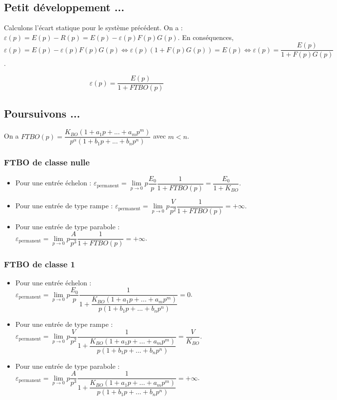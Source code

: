 \documentclass[10pt,fleqn]{article} %
\begin{document}
\subsection*{Petit développement ...}

Calculons l'écart statique pour le système précédent. On a : $\varepsilon(p)=E(p)-R(p)=E(p)-\varepsilon(p) F(p) G(p)$. En conséquences,
$\varepsilon(p)=E(p)-\varepsilon(p) F(p) G(p) 
\Longleftrightarrow \varepsilon(p)\left( 1+F(p) G(p) \right) =E(p) 
\Longleftrightarrow   \varepsilon(p) =\dfrac{E(p)}{1+F(p) G(p)}$.

\begin{resultat}
$$\varepsilon(p) =\dfrac{E(p)}{1+FTBO(p)}$$
\end{resultat}


\subsection*{Poursuivons ...}
On a $FTBO(p)=\dfrac{K_{BO}\left(1+a_1p+...+a_mp^m \right)}{p^{\alpha}\left(1+b_1p+...+b_np^n\right)}$ avec $m< n$.
\subsubsection*{FTBO de classe nulle}

\begin{itemize}
\item Pour une entrée échelon : 
$\varepsilon_{\text{permanent}}=\lim\limits_{p\to 0} p\dfrac{E_0}{p}\dfrac{1}{1+FTBO(p)} 
= \dfrac{E_0}{1+K_{BO}}$.
\item Pour une entrée de type rampe : 
$\varepsilon_{\text{permanent}}=\lim\limits_{p\to 0} p\dfrac{V}{p^2}\dfrac{1}{1+FTBO(p)} 
=+\infty$.
\item Pour une entrée de type parabole : 
$\varepsilon_{\text{permanent}}=\lim\limits_{p\to 0} p\dfrac{A}{p^3}\dfrac{1}{1+FTBO(p)} 
=+\infty$.
\end{itemize}

\subsubsection*{FTBO de classe 1}

\begin{itemize}
\item Pour une entrée échelon : 
$\varepsilon_{\text{permanent}}=\lim\limits_{p\to 0} p\dfrac{E_0}{p}\dfrac{1}{1+\dfrac{K_{BO}\left(1+a_1p+...+a_mp^m \right)}{p\left(1+b_1p+...+b_np^n\right)}} 
= 0$.
\item Pour une entrée de type rampe : 
$\varepsilon_{\text{permanent}}=\lim\limits_{p\to 0} p\dfrac{V}{p^2}\dfrac{1}{1+\dfrac{K_{BO}\left(1+a_1p+...+a_mp^m \right)}{p\left(1+b_1p+...+b_np^n\right)}} 
=\dfrac{V}{K_{BO}}$.
\item Pour une entrée de type parabole : 
$\varepsilon_{\text{permanent}}=\lim\limits_{p\to 0} p\dfrac{A}{p^3}\dfrac{1}{1+\dfrac{K_{BO}\left(1+a_1p+...+a_mp^m \right)}{p\left(1+b_1p+...+b_np^n\right)}} 
=+\infty$.
\end{itemize}
\end{document}
